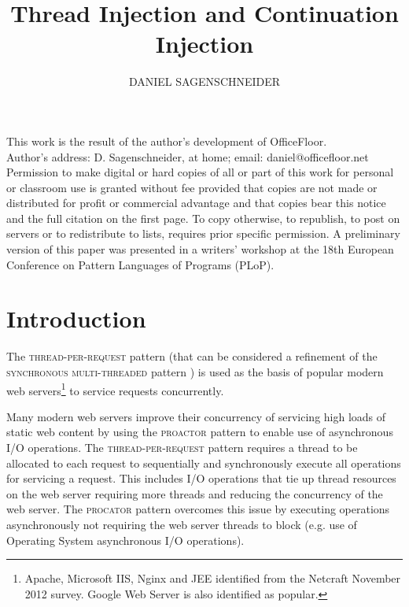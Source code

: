 \documentclass[prodmode]{style/acmlarge}
\title{Thread Injection and Continuation Injection}
\author{DANIEL SAGENSCHNEIDER \affil{daniel@officefloor.net}}
\begin{document}
\begin{bottomstuff}
This work is the result of the author's development of OfficeFloor.\\
Author's address: D. Sagenschneider, at home; email: daniel@officefloor.net\\

Permission to make digital or hard copies of all or part of this work for
personal or classroom use is granted without fee provided that copies are not
made or distributed for profit or commercial advantage and that copies bear this
notice and the full citation on the first page. To copy otherwise, to republish,
to post on servers or to redistribute to lists, requires prior specific
permission. A preliminary version of this paper was presented in a writers'
workshop at the 18th European Conference on Pattern Languages of Programs
(PLoP).
\end{bottomstuff}

\maketitle



\section{Introduction}

The \textsc{thread-per-request} pattern \cite{thread-per-request} (that can be
considered a refinement of the \textsc{synchronous multi-threaded} pattern
\cite{proactor}) is used as the basis of popular modern web
servers\footnote{Apache, Microsoft IIS, Nginx and JEE identified from the
Netcraft November 2012 survey.  Google Web Server is also identified as
popular.} to service requests concurrently.

Many modern web servers improve their concurrency of servicing high loads of
static web content by using the \textsc{proactor} pattern \cite{proactor} to
enable use of asynchronous I/O operations.  The \textsc{thread-per-request}
pattern requires a thread to be allocated to each request to sequentially and
synchronously execute all operations for servicing a request.  This includes I/O
operations that tie up thread resources on the web server requiring more threads
and reducing the concurrency of the web server.  The \textsc{procator} pattern
overcomes this issue by executing operations asynchronously not requiring the
web server threads to block (e.g. use of Operating System asynchronous I/O
operations).
\end{document}

